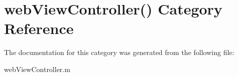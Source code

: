 \section{web\+View\+Controller() Category Reference}
\label{categoryweb_view_controller_07_08}


The documentation for this category was generated from the following file\+:\begin{DoxyCompactItemize}
\item 
web\+View\+Controller.\+m\end{DoxyCompactItemize}
